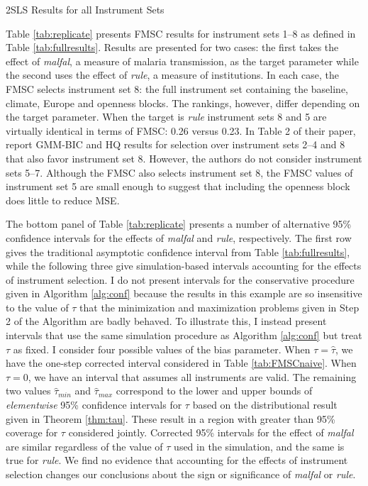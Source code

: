 \documentclass[12pt]{article}
\theoremstyle{definition}
\begin{document}
\begin{table}
\caption{2SLS Results for all Instrument Sets}
\label{tab:fullresults}
 \begin{center}



\end{center}

\end{table}



Table \ref{tab:replicate} presents FMSC results for instrument sets 1--8  as defined in Table \ref{tab:fullresults}. Results are presented for two cases: the first takes the effect of \emph{malfal}, a measure of malaria transmission, as the target parameter while the second uses the effect of \emph{rule}, a measure of institutions. In each case, the FMSC selects instrument set 8: the full instrument set containing the baseline, climate, Europe and openness blocks. The rankings, however, differ depending on the target parameter.  When the target is \emph{rule} instrument sets 8 and 5 are virtually identical in terms of FMSC: 0.26 versus 0.23. In Table 2 of their paper, \cite{Carstensen2006} report GMM-BIC and HQ results for selection over instrument sets 2--4 and 8 that also favor instrument set 8. However, the authors do not consider instrument sets 5--7. Although the FMSC also selects instrument set 8, the FMSC values of instrument set 5 are small enough to suggest that including the openness block does little to reduce MSE.

The bottom panel of Table \ref{tab:replicate} presents a number of alternative 95\% confidence intervals for the effects of \emph{malfal} and \emph{rule}, respectively. The first row gives the traditional asymptotic confidence interval from Table \ref{tab:fullresults}, while the following three give simulation-based intervals accounting for the effects of instrument selection. I do not present intervals for the conservative procedure given in Algorithm \ref{alg:conf} because the results in this example are so insensitive to the value of $\tau$ that the minimization and maximization problems given in Step 2 of the Algorithm are badly behaved. To illustrate this, I instead present intervals that use the same simulation procedure as Algorithm \ref{alg:conf} but treat $\tau$ as fixed. I consider four possible values of the bias parameter. When $\tau = \widehat{\tau}$, we have the one-step corrected interval considered in Table \ref{tab:FMSCnaive}. When $\tau = 0$, we have an interval that assumes all instruments are valid. The remaining two values $\widehat{\tau}_{min}$ and $\widehat{\tau}_{max}$ correspond to the lower and upper bounds of \emph{elementwise} 95\% confidence intervals for $\tau$ based on the distributional result given in Theorem \ref{thm:tau}. These result in a region with greater than 95\% coverage for $\tau$ considered jointly. Corrected 95\% intervals for the effect of \emph{malfal} are similar regardless of the value of $\tau$ used in the simulation, and the same is true for \emph{rule}. We find no evidence that accounting for the effects of instrument selection changes our conclusions about the sign or significance of \emph{malfal} or \emph{rule}.
\end{document}
